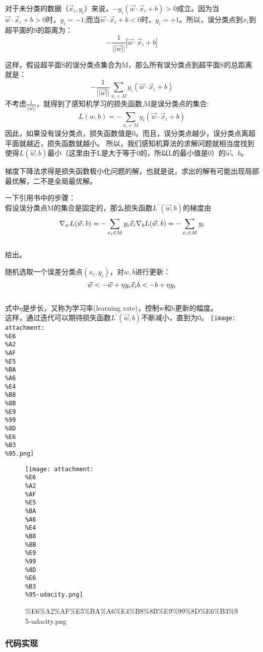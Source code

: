 \documentclass[11pt]{article}
\makeatletter
\def\maxwidth{\ifdim\Gin@nat@width>\linewidth\linewidth
    \else\Gin@nat@width\fi}
\let\Oldincludegraphics\includegraphics
\renewcommand{\includegraphics}[1]{\Oldincludegraphics[width=.8\maxwidth]{#1}}
\makeatother
\begin{document}
对于未分类的数据（\(\vec x_i, y_i\)）来说，\(-y_i(\vec w \cdot \vec x_i + b) > 0\)成立。因为当\(\vec w \cdot \vec x_i + b > 0\)时，\(y_i = -1\);而当\(\vec w \cdot \vec x_i + b < 0\)时，\(y_i = +1\)。所以，误分类点到\(x_i\)到超平面的S的距离为：
\[
-\frac{1}{||\vec w||} |\vec w \cdot \vec x_i + b|
\]

这样，假设超平面S的误分类点集合为M，那么所有误分类点到超平面S的总距离就是：
\[
-\frac{1}{||\vec w||}\sum_{x_i \in M} y_i (\vec w \cdot \vec x_i + b)
\]
不考虑\(\frac{1}{||\vec w||}\)，就得到了感知机学习的损失函数,M是误分类点的集合:
\[
L(w, b) = -\sum_{x_i \in M} y_i(\vec w \cdot \vec x_i + b)
\]
因此，如果没有误分类点，损失函数值是0。而且，误分类点越少，误分类点离超平面就越近，损失函数就越小。
所以，我们感知机算法的求解问题就相当度找到使得\(L(\vec w, b)\)最小（这里由于L是大于等于0的，所以L的最小值是0）的\(\vec w、b\)。

    梯度下降法求得是损失函数极小化问题的解，也就是说，求出的解有可能出现局部最优解，二不是全局最优解。

    一下引用书中的步骤：\\
假设误分类点M的集合是固定的，那么损失函数\(L^{'}(\vec w, b)\)的梯度由 \[
\\
\nabla_w L(\vec w, b) = - \sum_{x_i \in M} y_i \vec x_i\\\\\\
\nabla_b L(\vec w, b) = - \sum_{x_i \in M} y_i
\]\\
给出。

随机选取一个误差分类点\((x_i, y_i)\)，对\(w, b\)进行更新： \[
\\
\vec w <- \vec w + \eta y_i \vec x_i \\
b <- b + \eta y_i
\]\\
式中\(\eta\)是步长，又称为学习率(learning rate)，控制w和b更新的幅度。\\
这样，通过迭代可以期待损失函数\(L^{'}(\vec w, b)\)不断减小，直到为0。
\texttt{[image: attachment:\\\%E6\\\%A2\\\%AF\\\%E5\\\%BA\\\%A6\\\%E4\\\%B8\\\%8B\\\%E9\\\%99\\\%8D\\\%E6\\\%B3\\\%95.png]}

    \begin{figure}
\centering
\texttt{[image: attachment:\\\%E6\\\%A2\\\%AF\\\%E5\\\%BA\\\%A6\\\%E4\\\%B8\\\%8B\\\%E9\\\%99\\\%8D\\\%E6\\\%B3\\\%95-udacity.png]}
\caption{\%E6\%A2\%AF\%E5\%BA\%A6\%E4\%B8\%8B\%E9\%99\%8D\%E6\%B3\%95-udacity.png}
\end{figure}

    \hypertarget{ux4ee3ux7801ux5b9eux73b0}{%
\subsubsection{代码实现}\label{ux4ee3ux7801ux5b9eux73b0}}
\end{document}
